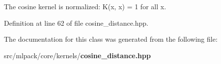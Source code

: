 The cosine kernel is normalized\-: K(x, x) = 1 for all x. 



Definition at line 62 of file cosine\-\_\-distance.\-hpp.



The documentation for this class was generated from the following file\-:\begin{DoxyCompactItemize}
\item 
src/mlpack/core/kernels/{\bf cosine\-\_\-distance.\-hpp}\end{DoxyCompactItemize}
